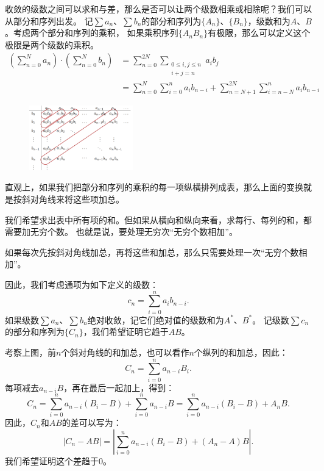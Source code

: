 \documentclass[12pt,UTF8]{ctexbook}
\begin{document}
收敛的级数之间可以求和与差，那么是否可以让两个级数相乘或相除呢？我们可以从部分和序列出发。
记$\sum a_n$、$\sum b_n$的部分和序列为$\{A_n\}$、$\{B_n\}$，级数和为$A$、$B$。考虑两个部分和序列的乘积，
如果乘积序列$\{A_nB_n\}$有极限，那么可以定义这个极限是两个级数的乘积。
\begin{align*}
    \left(\sum_{n=0}^{N} a_n \right) \cdot \left(\sum_{n=0}^{N} b_n \right) &= \sum_{n=0}^{2N} \sum_{\substack{0\leqslant i,j \leqslant n \\ i+j=n}} a_i b_j \\
    &= \sum_{n=0}^{N} \sum_{i=0}^n a_i b_{n-i} + \sum_{n=N+1}^{2N} \sum_{i=n-N}^n a_i b_{n-i}
\end{align*}

\begin{figure} %
    \vspace{-32pt}
    \flushright
    \includegraphics[width=0.4\textwidth]{tu/级数乘积.png}
\end{figure}

直观上，如果我们把部分和序列的乘积的每一项纵横排列成表，那么上面的变换就是按斜对角线来将这些项加总。

我们希望求出表中所有项的和。但如果从横向和纵向来看，求每行、每列的和，都需要加无穷个数。
也就是说，要处理无穷次“无穷个数相加”。

如果每次先按斜对角线加总，再将这些和加总，那么只需要处理一次“无穷个数相加”。

因此，我们考虑通项为如下定义的级数：
$$ c_n = \sum_{i=0}^n a_i b_{n-i} . $$
如果级数$\sum a_n$、$\sum b_n$绝对收敛，记它们绝对值的级数和为$A^*$、$B^*$。
记级数$\sum c_n$的部分和序列为$\{C_n\}$，我们希望证明它趋于$AB$。

考察上图，前$n$个斜对角线的和加总，也可以看作$n$个纵列的和加总，因此：
$$C_n = \sum_{i=0}^{n} a_{n-i} B_i. $$
每项减去$a_{n-i}B$，再在最后一起加上，得到：
$$ C_n = \sum_{i=0}^{n} a_{n-i} (B_i - B) + \sum_{i=0}^n a_{n-i} B = \sum_{i=0}^{n} a_{n-i} (B_i - B) + A_n B. $$
因此，$C_n$和$AB$的差可以写为：
$$ |C_n - AB| = \left|\sum_{i=0}^{n} a_{n-i} (B_i - B) + (A_n - A) B \right|. $$
我们希望证明这个差趋于$0$。
\end{document}
